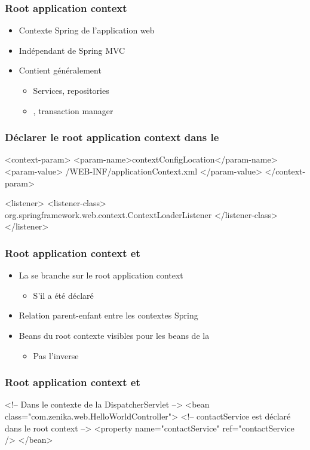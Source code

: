 \begin{frame}
 \frametitle{Root application context}
 
  \begin{itemize}
   \item Contexte Spring de l'application web
   \item Indépendant de Spring MVC
   \item Contient généralement
   \begin{itemize}
    \item Services, repositories
    \item {}, transaction manager
   \end{itemize}
  \end{itemize}
 
\end{frame}

\begin{frame}[fragile]
 \frametitle{Déclarer le root application context dans le }
  
 \begin{xmlcode}
<context-param>
  <param-name>contextConfigLocation</param-name>
  <param-value>
    /WEB-INF/applicationContext.xml
  </param-value>
</context-param>

<listener>
  <listener-class>
    org.springframework.web.context.ContextLoaderListener
  </listener-class>
</listener>
 \end{xmlcode}
 
\end{frame}

\begin{frame}
 \frametitle{Root application context et }
 
 \begin{itemize}
  \item La  se branche sur le root application context
  \begin{itemize}
   \item S'il a été déclaré
  \end{itemize}
  \item Relation parent-enfant entre les contextes Spring
  \item Beans du root contexte visibles pour les beans de la 
  \begin{itemize}
   \item Pas l'inverse
  \end{itemize}
 \end{itemize}
 
\end{frame}

\begin{frame}[fragile]
 \frametitle{Root application context et }
 
 \begin{xmlcode}
<!-- Dans le contexte de la DispatcherServlet -->
<bean class="com.zenika.web.HelloWorldController">
  <!-- contactService est d\'eclar\'e dans le root context -->
  <property name="contactService" 
            ref="contactService />
</bean>
 \end{xmlcode}
 
\end{frame}